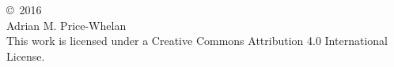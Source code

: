 \vspace*{7in}

\noindent

{
	\pagestyle{empty}
	
	\begin{center}
		\copyright\, 2016 \\
		Adrian M. Price-Whelan \\
		This work is licensed under a Creative Commons Attribution 4.0 International License.
	\end{center}
}
\clearpage
